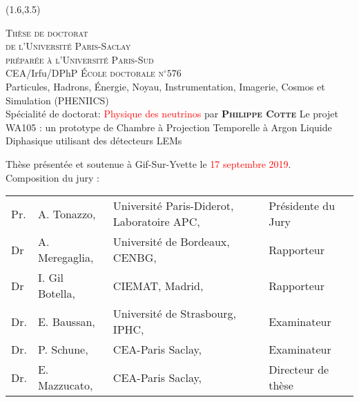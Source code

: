 \begin{textblock}{12.8}(1.6,3.5)
  \begin{center}
    \textcolor{pheniics_purple}{ %
      \LARGE\textsc{Thèse de doctorat\\ de l'Université Paris-Saclay} \\
      \LARGE{\textsc{préparée à l'Université Paris-Sud}} \\ \bigskip
  	  \color{black} %
	  \vfill \vfill
	  \Large{CEA/Irfu/DPhP}
	  \vfill \vfill
      \Large\textsc{École doctorale n$^{\circ}576$}\\ %
      \Large{Particules, Hadrons, Énergie, Noyau, Instrumentation, Imagerie, Cosmos et Simulation (PHENIICS)} \\
	  \Large{Spécialité de doctorat: \textcolor{red}{Physique des neutrinos} } %
      \vfill  
   	  \Large{par}
   	  \vfill
   	  \LARGE{\textbf{\textsc{Philippe Cotte}}} %
      \vfill
      \Large{Le projet WA105 : un prototype de Chambre à Projection Temporelle à Argon Liquide Diphasique utilisant des détecteurs LEMs} %
      \vfill
    }
  \end{center}

  \small{
    \begin{flushleft}
    Thèse présentée et soutenue à Gif-Sur-Yvette le \textcolor{red}{17 septembre 2019}. \\
    \bigskip
    Composition du jury :
    \end{flushleft}

    \begin{center}
      \begin{tabular}{llll}

	
	    Pr.		& A. Tonazzo,			& Université Paris-Diderot, Laboratoire
APC,		& Présidente du Jury	\\
  	    Dr		& A. Meregaglia,			& Université de Bordeaux, CENBG,		& Rapporteur			\\	
  	    Dr		& I. Gil Botella,			& CIEMAT, Madrid,		& Rapporteur			\\
  	    Dr.		& E. Baussan,			& Université de Strasbourg, IPHC,		& Examinateur		\\
  	    Dr.		& P. Schune,			& CEA-Paris Saclay,		& Examinateur		\\
	    Dr.		& E. Mazzucato,			& CEA-Paris Saclay,		& Directeur de thèse	\\  
   
      \end{tabular}    
    \end{center}
  }

\end{textblock}

